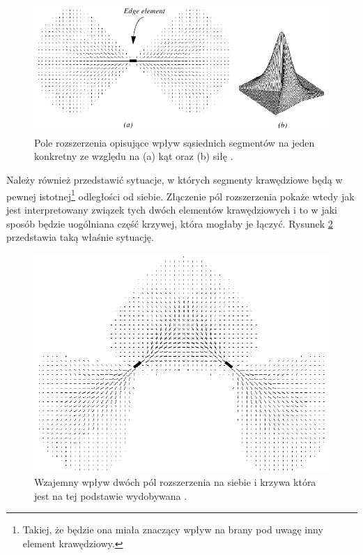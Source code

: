 \begin{figure}[ht]
	\centering
	\includegraphics[width=1\textwidth]{images/gpc_ef.png}
	\caption{Pole rozszerzenia opisujące wpływ sąsiednich segmentów na jeden konkretny ze względu na (a) kąt oraz (b) siłę \cite{Guy1993}.}
	\label{fig:gpc_ef}
\end{figure}

Należy również przedstawić sytuacje, w których segmenty krawędziowe będą w pewnej istotnej\footnote{Takiej, że będzie ona miała znaczący wpływ na brany pod uwagę inny element krawędziowy.} odległości od siebie. Złączenie pól rozszerzenia pokaże wtedy jak jest interpretowany związek tych dwóch elementów krawędziowych i to w jaki sposób będzie uogólniana część krzywej, która mogłaby je łączyć. Rysunek \ref{fig:gpc_2ef} przedstawia taką właśnie sytuację.

\begin{figure}[ht]
	\centering
	\includegraphics[width=.9\textwidth]{images/gpc_2ef.png}
	\caption{Wzajemny wpływ dwóch pól rozszerzenia na siebie i krzywa która jest na tej podstawie wydobywana \cite{Guy1993}.}
	\label{fig:gpc_2ef}
\end{figure}

